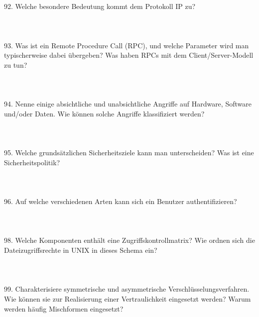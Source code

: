 \documentclass{article}
\begin{document}
\\
\\
92. Welche besondere Bedeutung kommt dem Protokoll IP zu?
\\
\\
\\
\\
93. Was ist ein Remote Procedure Call (RPC), und welche Parameter wird man typischerweise
dabei übergeben? Was haben RPCs mit dem Client/Server-Modell zu tun?
\\
\\
\\
\\
94. Nenne einige absichtliche und unabsichtliche Angriffe auf Hardware, Software und/oder
Daten. Wie können solche Angriffe klassifiziert werden?
\\
\\
\\
\\
95. Welche grundsätzlichen Sicherheitsziele kann man unterscheiden? Was ist eine Sicherheitspolitik?
\\
\\
\\
\\
96. Auf welche verschiedenen Arten kann sich ein Benutzer authentifizieren?
\\
\\
\\
\\
98. Welche Komponenten enthält eine Zugriffskontrollmatrix? Wie ordnen sich die Dateizugriffsrechte in UNIX in dieses Schema ein?
\\
\\
\\
\\
99. Charakterisiere symmetrische und asymmetrische Verschlüsselungsverfahren. Wie können sie
zur Realisierung einer Vertraulichkeit eingesetzt werden? Warum werden häufig Mischformen
eingesetzt?
\end{document}
